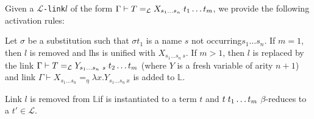 \documentclass[sigconf,natbib=false,review]{acmart}
\newcommand{\appsep}{\ensuremath{\textcolor{lightgray}{\cdot}}}
\newcommand{\llambda}{\ensuremath{\mathcal{L}}\xspace}
\newcommand{\linkMacro}[1]{\ensuremath{#1}\texttt{-link}\xspace}
\newcommand{\linkbeta}{\linkMacro{\llambda}}
\newcommand{\linketaM}[3]{\ensuremath{#1 \vdash #2 =_\eta #3}}
\newcommand{\linkbetaM}[3]{\ensuremath{#1 \vdash #2 =_{\llambda} #3}}
\newcommand{\lhs}{lhs\xspace}
\newcommand{\rhs}{rhs\xspace}
\newcommand{\linkStore}{\texorpdfstring{\ensuremath{\mathbb{L}}\xspace}{L}}
\begin{document}
Given a \linkbeta $l$ of the form \linkbetaM{\Gamma}{T}{\rhsBeta}, we provide
the following activation rules:

\begin{definition}[\progBetaLL]
  Let $\sigma$ be a substitution such that $\sigma t_1$ is a name $s$
  not occurring$s_1\dots s_n$. If $m = 1$, then $l$ is removed and \lhs is
  unified with $X_{s_1\ldots s_n~s}$.
  If $m > 1$, then $l$ is replaced by the link
  $\linkbetaM{\Gamma}{T}{Y_{s_1\dots s_n~s}\appsep t_2\dots t_m}$
  (where $Y$ is a fresh variable of arity $n+1$) and link
  \linketaM{\Gamma}{X_{s_1\dots s_n}}{\lambda x.Y_{s_1\dots s_n~x}}
  is added to \linkStore.   
  \label{def:progBetaLL}
\end{definition}

\begin{definition}[\progBetaRH]
  Link $l$ is removed from
  \linkStore if \rhsBetaHead is instantiated to a term $t$ and
  $t \appsep t_1 \ldots t_m$ $\beta$-reduces to a $t' \in \llambda$.
  \label{def:progBetaRH}
\end{definition}
\end{document}
